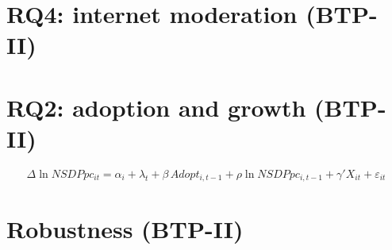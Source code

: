 \section{RQ4: internet moderation (BTP-II)}

\section{RQ2: adoption and growth (BTP-II)}
\begin{equation}
\Delta \ln NSDPpc_{it} = \alpha_i + \lambda_t + \beta\, Adopt_{i,t-1} + \rho \ln NSDPpc_{i,t-1} + \gamma' X_{it} + \varepsilon_{it}
\label{eq:growth}
\end{equation}

\section{Robustness (BTP-II)}
